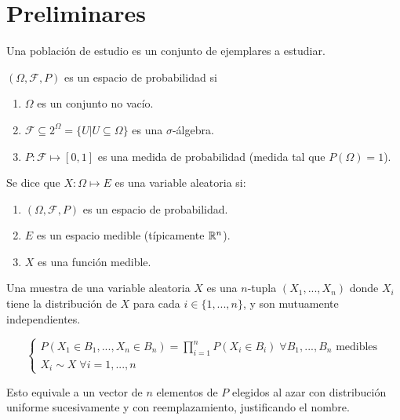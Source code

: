 


\chapter{Preliminares}

\begin{definicion}[Población]
    Una población de estudio es un conjunto de ejemplares a estudiar.
\end{definicion}

\begin{definicion}
    $(\Omega, \mathcal{F}, P)$ es un espacio de probabilidad si
    \begin{enumerate}
        \item $\Omega$ es un conjunto no vacío.
        \item $\mathcal{F} \subseteq 2^\Omega = \{U | U \subseteq \Omega \}$ es una $\sigma$-álgebra.
        \item $P: \mathcal{F} \mapsto [0, 1]$ es una medida de probabilidad (medida tal que $P(\Omega) = 1$).
    \end{enumerate}
\end{definicion}

\begin{definicion}
    Se dice que $X:\Omega \mapsto E$ es una variable aleatoria si:
    \begin{enumerate}
        \item $(\Omega, \mathcal{F}, P)$ es un espacio de probabilidad.
        \item $E$ es un espacio medible (típicamente $\mathbb{R}^n$).
        \item $X$ es una función medible.
    \end{enumerate}
\end{definicion}

\begin{definicion}\label{def:muestra}
    Una muestra de una variable aleatoria $X$ es una $n$-tupla $(X_1,...,X_n)$
    donde $X_i$ tiene la distribución de $X$ para cada $i \in \{1, ..., n\}$, y son
    mutuamente independientes.

    \begin{displaymath}
        \begin{cases}
            P(X_1 \in B_1, ..., X_n \in B_n) = \prod_{i=1}^n P(X_i \in B_i) \;\forall B_1, ..., B_n \text{ medibles} \\
            X_i \sim X \;\forall i = 1, ..., n
        \end{cases}
    \end{displaymath}

    Esto equivale a un vector de $n$ elementos de $P$ elegidos al azar
    con distribución uniforme sucesivamente y con reemplazamiento,
    justificando el nombre.
\end{definicion}

